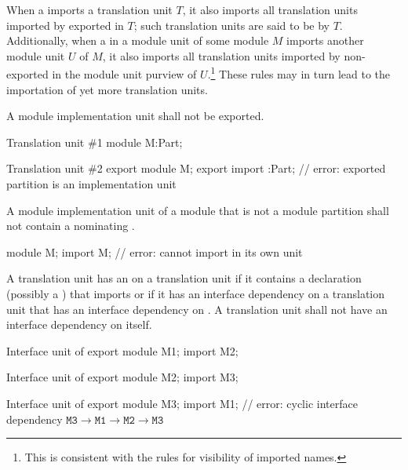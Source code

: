 \pnum
When a  imports
a translation unit $T$, it also imports
all translation units imported by
exported 
in $T$; such translation units are
said to be  by $T$.
Additionally, when a 
in a module unit of some module $M$ imports another module unit $U$ of $M$,
it also imports all translation units imported by
non-exported 
in the module unit purview of $U$.\footnote{This is consistent
with the rules for visibility of imported names.}
These rules may in turn lead to the importation of yet more
translation units.

\pnum
A module implementation unit shall not be exported.
\begin{example}
\begin{codeblocktu}{Translation unit \#1}
module M:Part;
\end{codeblocktu}

\begin{codeblocktu}{Translation unit \#2}
export module M;
export import :Part;    // error: exported partition  is an implementation unit
\end{codeblocktu}
\end{example}

\pnum
A module implementation unit of a module 
that is not a module partition
shall not contain a 
nominating .
\begin{example}
\begin{codeblock}
module M;
import M;               // error: cannot import  in its own unit
\end{codeblock}
\end{example}

\pnum
A translation unit has an  on a translation unit 
if it contains a declaration (possibly a )
that imports  or if it has
an interface dependency on a translation unit that has an interface dependency on .
A translation unit shall not have an interface dependency on itself.
\begin{example}
\begin{codeblocktu}{Interface unit of }
export module M1;
import M2;
\end{codeblocktu}

\begin{codeblocktu}{Interface unit of }
export module M2;
import M3;
\end{codeblocktu}

\begin{codeblocktu}{Interface unit of }
export module M3;
import M1;              // error: cyclic interface dependency $\mathtt{M3} \rightarrow \mathtt{M1} \rightarrow \mathtt{M2} \rightarrow \mathtt{M3}$
\end{codeblocktu}
\end{example}


